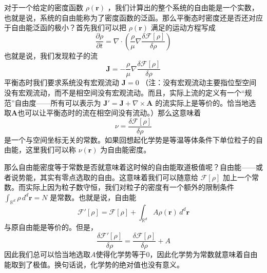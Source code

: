 \documentclass{ctexart}
\begin{document}
对于一个给定的密度函数 $\rho(\bm{r})$ ，我们计算出的整个系统的自由能是一个实数，也就是说，系统的自由能称为了密度函数的泛函。那么平衡态时密度还是否还对应于自由能泛函的极小？首先我们可以把 $\rho(\bm{r})$ 满足的运动方程写成
\begin{equation}
\frac{\partial\rho}{\partial t}=\nabla\cdot\left(\frac{\rho}{\mu}\nabla\frac{\delta\mathcal{F}[\rho]}{\delta\rho}\right)
\end{equation}
也就是说，我们发现粒子的流
\begin{equation}
\bm{J}=-\frac{\rho}{\mu}\nabla\frac{\delta\mathcal{F}[\rho]}{\delta\rho}
\end{equation}
平衡态时我们要求系统没有宏观流动 $\bm{J}=0$ （注：没有宏观流动主要指位型空间没有宏观流动，而不是相空间没有宏观流动。而且，实际上流的定义有一个“规范”自由度——所有可以表示为 $\bm{J}'=\bm{J}+\nabla\times\bm{A}$ 的流实际上是等价的。恰当地选取$\bm{A}$也可以让平衡态时的流在相空间没有流动。）那么这意味着
\begin{equation}
\nu=\frac{\delta\mathcal{F}[\rho]}{\delta\rho}
\end{equation}
是一个与空间坐标无关的常数。如果回想起化学势是等温等体条件下单位粒子的自由能，这里我们可以称 $\nu(\bm{r})$ 为自由能密度。

那么自由能密度等于常数是否就意味着这时候的自由能取道极值呢？自由能——或者说势能，其实有零点选取的自由。这意味着我们可以随意给 $\mathcal{F}[\rho]$ 加上一个常数。而实际上因为粒子数守恒，我们对粒子的密度有一个额外的限制条件 $\int_{\mathbb{R}^d}\rho\, d^d\bm{r}=N$ 是常数。也就是说，自由能
\begin{equation}
\mathcal{F}'[\rho]=\mathcal{F}[\rho]+\int_{\mathbb{R}^d} A\rho(\bm{r})\, d^d\bm{r}
\end{equation}
与原自由能是等价的。但是，
\begin{equation}
\frac{\delta\mathcal{F}'[\rho]}{\delta\rho}=\frac{\delta\mathcal{F}[\rho]}{\delta\rho}+A
\end{equation}
因此我们总可以恰当地选取$A$使得化学势等于0，因此化学势为常数就意味着自由能取到了极值。换句话说，化学势的绝对值也没有意义。
\end{document}
